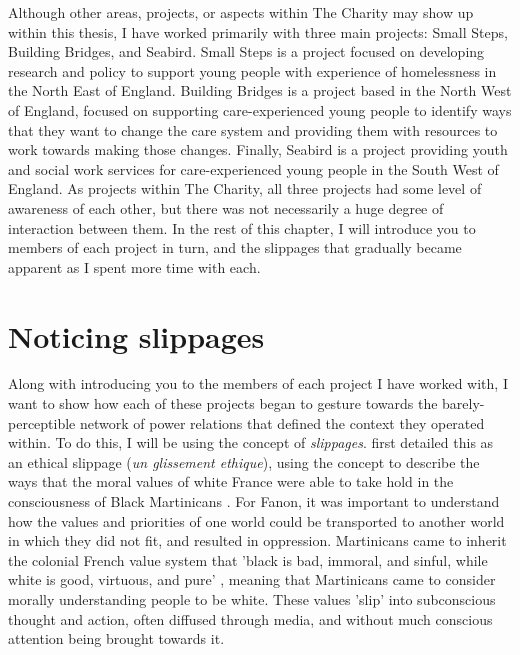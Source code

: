 Although other areas, projects, or aspects within The Charity may show up within this thesis, I have worked primarily with three main projects: Small Steps, Building Bridges, and Seabird. Small Steps is a project focused on developing research and policy to support young people with experience of homelessness in the North East of England. Building Bridges is a project based in the North West of England, focused on supporting care-experienced young people to identify ways that they want to change the care system and providing them with resources to work towards making those changes. Finally, Seabird is a project providing youth and social work services for care-experienced young people in the South West of England. As projects within The Charity, all three projects had some level of awareness of each other, but there was not necessarily a huge degree of interaction between them. In the rest of this chapter, I will introduce you to members of each project in turn, and the slippages that gradually became apparent as I spent more time with each. 

\section{Noticing slippages}

Along with introducing you to the members of each project I have worked with, I want to show how each of these projects began to gesture towards the barely-perceptible network of power relations that defined the context they operated within. To do this, I will be using the concept of \textit{slippages}. \cite{fanon_black_1986} first detailed this as an ethical slippage (\textit{un glissement ethique}), using the concept to describe the ways that the moral values of white France were able to take hold in the consciousness of Black Martinicans . For Fanon, it was important to understand how the values and priorities of one world could be transported to another world in which they did not fit, and resulted in oppression. Martinicans came to inherit the colonial French value system that 'black is bad, immoral, and sinful, while white is good, virtuous, and pure' \citep[11]{sullivan_ethical_2004}, meaning that Martinicans came to consider morally understanding people to be white. These values 'slip' into subconscious thought and action, often diffused through media, and without much conscious attention being brought towards it. 

